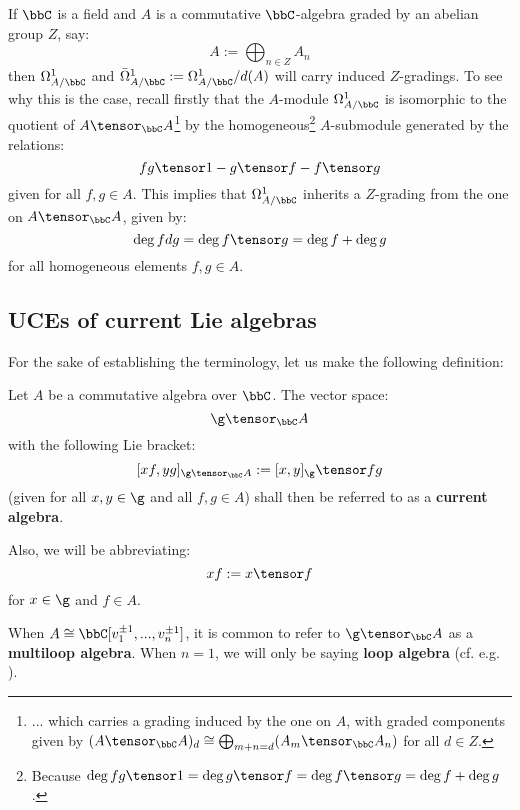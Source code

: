         \begin{remark} \label{remark: gradings_on_1_forms}
            If $\bbC$ is a field and $A$ is a commutative $\bbC$-algebra graded by an abelian group $Z$, say:
                $$A := \bigoplus_{n \in Z} A_n$$
            then $\Omega^1_{A/\bbC}$ and $\bar{\Omega}^1_{A/\bbC} := \Omega^1_{A/\bbC}/d(A)$ will carry induced $Z$-gradings. To see why this is the case, recall firstly that the $A$-module $\Omega^1_{A/\bbC}$ is isomorphic to the quotient of $A \tensor_{\bbC} A$\footnote{... which carries a grading induced by the one on $A$, with graded components given by $(A \tensor_{\bbC} A)_d \cong \bigoplus_{m + n = d} (A_m \tensor_{\bbC} A_n)$ for all $d \in Z$.} by the homogeneous\footnote{Because $\deg fg \tensor 1 = \deg g \tensor f = \deg f \tensor g = \deg f + \deg g$.} $A$-submodule generated by the relations:
                $$fg \tensor 1 - g \tensor f - f \tensor g$$
            given for all $f, g \in A$. This implies that $\Omega^1_{A/\bbC}$ inherits a $Z$-grading from the one on $A \tensor_{\bbC} A$, given by:
                $$\deg f dg = \deg f \tensor g = \deg f + \deg g$$
            for all homogeneous elements $f, g \in A$. 
        \end{remark}

    \subsection{UCEs of current Lie algebras}
        For the sake of establishing the terminology, let us make the following definition:
        \begin{definition} \label{def: current_algebras}
            Let $A$ be a commutative algebra over $\bbC$. The vector space:
                $$\g \tensor_{\bbC} A$$
            with the following Lie bracket:
                $$[x f, y g]_{\g \tensor_{\bbC} A} := [x, y]_{\g} \tensor fg$$
            (given for all $x, y \in \g$ and all $f, g \in A$) shall then be referred to as a \textbf{current algebra}. 
                
            Also, we will be abbreviating:
                $$xf := x \tensor f$$
            for $x \in \g$ and $f \in A$.
        \end{definition}
        \begin{convention}
            When $A \cong \bbC[v_1^{\pm 1}, ..., v_n^{\pm 1}]$, it is common to refer to $\g \tensor_{\bbC} A$ as a \textbf{multiloop algebra}. When $n = 1$, we will only be saying \textbf{loop algebra} (cf. e.g. \cite[Chapter 7]{kac_infinite_dimensional_lie_algebras}).
        \end{convention}

